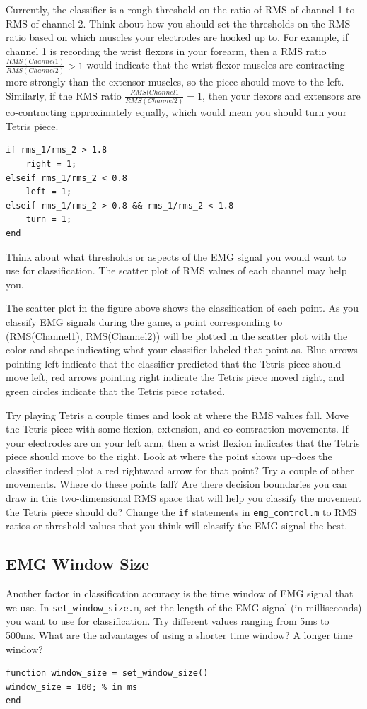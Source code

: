 \documentclass[10pt,oneside,a4paper]{article}
\begin{document}
Currently, the classifier is a rough threshold on the ratio of RMS of channel 1 to RMS of channel 2. Think about how you should set the thresholds on the RMS ratio based on which muscles your electrodes are hooked up to. For example, if channel 1 is recording the wrist flexors in your forearm, then a RMS ratio $\frac{RMS(Channel1)}{RMS(Channel2)} > 1$ would indicate that the wrist flexor muscles are contracting more strongly than the extensor muscles, so the piece should move to the left. Similarly, if the RMS ratio $\frac{RMS(Channel1}{RMS(Channel2)} = 1$, then your flexors and extensors are co-contracting approximately equally, which would mean you should turn your Tetris piece. 
\begin{verbatim}
if rms_1/rms_2 > 1.8
    right = 1;
elseif rms_1/rms_2 < 0.8
    left = 1;
elseif rms_1/rms_2 > 0.8 && rms_1/rms_2 < 1.8
    turn = 1;
end
\end{verbatim}
Think about what thresholds or aspects of the EMG signal you would want to use for classification. The scatter plot of RMS values of each channel may help you.

The scatter plot in the figure above shows the classification of each point. As you classify EMG signals during the game, a point corresponding to (RMS(Channel1), RMS(Channel2)) will be plotted in the scatter plot with the color and shape indicating what your classifier labeled that point as. {\color{blue} Blue arrows} pointing left indicate that the classifier predicted that the Tetris piece should move left, {\color{red} red arrows} pointing right indicate the Tetris piece moved right, and {\color{green} green circles} indicate that the Tetris piece rotated.

Try playing Tetris a couple times and look at where the RMS values fall. Move the Tetris piece with some flexion, extension, and co-contraction movements. If your electrodes are on your left arm, then a wrist flexion indicates that the Tetris piece should move to the right. Look at where the point shows up--does the classifier indeed plot a red rightward arrow for that point? Try a couple of other movements. Where do these points fall? Are there decision boundaries you can draw in this two-dimensional RMS space that will help you classify the movement the Tetris piece should do? Change the \texttt{if} statements in \texttt{emg\_control.m} to RMS ratios or threshold values that you think will classify the EMG signal the best. 
\subsection{EMG Window Size}
Another factor in classification accuracy is the time window of EMG signal that we use. In \texttt{set\_window\_size.m}, set the length of the EMG signal (in milliseconds) you want to use for classification. Try different values ranging from 5ms to 500ms. What are the advantages of using a shorter time window? A longer time window?
\begin{verbatim}
function window_size = set_window_size()
window_size = 100; % in ms
end
\end{verbatim}
\end{document}

